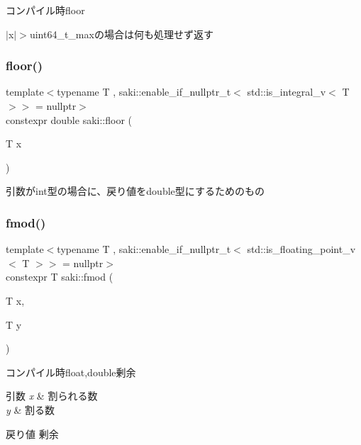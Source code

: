 コンパイル時floor 

$\vert$x$\vert$$>$uint64\+\_\+t\+\_\+maxの場合は何も処理せず返す \mbox{\label{namespacesaki_a327cd6800fef212948644f69cb31d4ff}} 
\subsubsection{\texorpdfstring{floor()}{floor()}\hspace{0.1cm}{\footnotesize\ttfamily [2/2]}}
{\footnotesize\ttfamily template$<$typename T , saki\+::enable\+\_\+if\+\_\+nullptr\+\_\+t$<$ std\+::is\+\_\+integral\+\_\+v$<$ T $>$$>$  = nullptr$>$ \\
constexpr double saki\+::floor (\begin{DoxyParamCaption}\item[{T}]{x }\end{DoxyParamCaption})}



引数がint型の場合に、戻り値をdouble型にするためのもの 

\mbox{\label{namespacesaki_a8a7b926b9d370e4a9aed84579675222c}} 
\subsubsection{\texorpdfstring{fmod()}{fmod()}\hspace{0.1cm}{\footnotesize\ttfamily [1/2]}}
{\footnotesize\ttfamily template$<$typename T , saki\+::enable\+\_\+if\+\_\+nullptr\+\_\+t$<$ std\+::is\+\_\+floating\+\_\+point\+\_\+v$<$ T $>$$>$  = nullptr$>$ \\
constexpr T saki\+::fmod (\begin{DoxyParamCaption}\item[{T}]{x,  }\item[{T}]{y }\end{DoxyParamCaption})}



コンパイル時float,double剰余 


\begin{DoxyParams}{引数}
{\em x} & 割られる数 \\
\hline
{\em y} & 割る数 \\
\hline
\end{DoxyParams}
\begin{DoxyReturn}{戻り値}
剰余 
\end{DoxyReturn}
\mbox{\label{namespacesaki_ae310926c3d50042c53a68ac85b5d6090}} 
